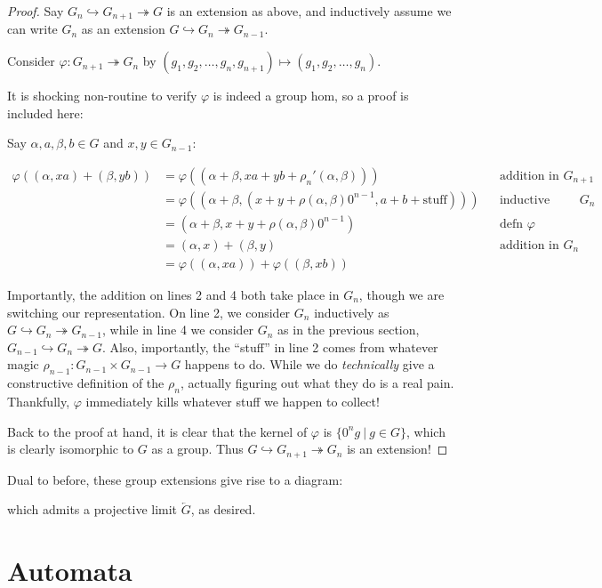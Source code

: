 \documentclass[12pt]{article}
\theoremstyle{definition}
\newcommand{\mono}{\hookrightarrow}
\newcommand{\epi}{\twoheadrightarrow}
\begin{document}
  \begin{proof}
    Say $G_n \mono G_{n+1} \epi G$ is an extension as above, and 
    inductively assume we can write $G_n$ as an extension
    $G \mono G_n \epi G_{n-1}$.

    Consider $\varphi : G_{n+1} \epi G_n$ by 
    $(g_1, g_2, \ldots, g_n, g_{n+1}) \mapsto (g_1, g_2, \ldots, g_n)$.

    It is shocking non-routine to verify $\varphi$ is indeed a group hom, 
    so a proof is included here:

    Say $\alpha, a, \beta, b \in G$ and $x,y \in G_{n-1}$:

    \begin{align*}
      \varphi((\alpha, xa) + (\beta, yb)) 
      &= \varphi((\alpha + \beta, xa + yb + \rho_n'(\alpha,\beta))) 
        && \text{addition in $G_{n+1}$}\\
      &= \varphi((\alpha + \beta, (x + y + \rho(\alpha,\beta)0^{n-1}, a + b + \text{stuff})))
        && \text{inductive addition in $G_n$}\\
      &= (\alpha + \beta, x+y+\rho(\alpha,\beta)0^{n-1})
        && \text{defn $\varphi$}\\
      &= (\alpha, x) + (\beta, y)
        && \text{addition in $G_n$}\\
      &= \varphi((\alpha,xa)) + \varphi((\beta,xb))
    \end{align*}

    Importantly, the addition on lines 2 and 4 both take place in $G_n$, 
    though we are switching our representation. On line 2, we consider
    $G_n$ inductively as $G \mono G_n \epi G_{n-1}$, while in line 4 we
    consider $G_n$ as in the previous section, $G_{n-1} \mono G_n \epi G$.
    Also, importantly, the ``stuff'' in line 2 comes from whatever
    magic $\rho_{n-1} : G_{n-1} \times G_{n-1} \to G$ happens to do. While
    we do \emph{technically} give a constructive definition of the $\rho_n$,
    actually figuring out what they do is a real pain. Thankfully, $\varphi$
    immediately kills whatever stuff we happen to collect!

    Back to the proof at hand, it is clear that the kernel of $\varphi$ is
    $\{0^ng~|~g \in G \}$, which is clearly isomorphic to $G$ as a group. 
    Thus $G \mono G_{n+1} \epi G_n$ is an extension! 
  \end{proof}

  Dual to before, these group extensions give rise to a diagram:

  \begin{center}
  \end{center}

  which admits a projective limit $\overleftarrow{G}$, as desired.

  \section{Automata}
    
\end{document}
